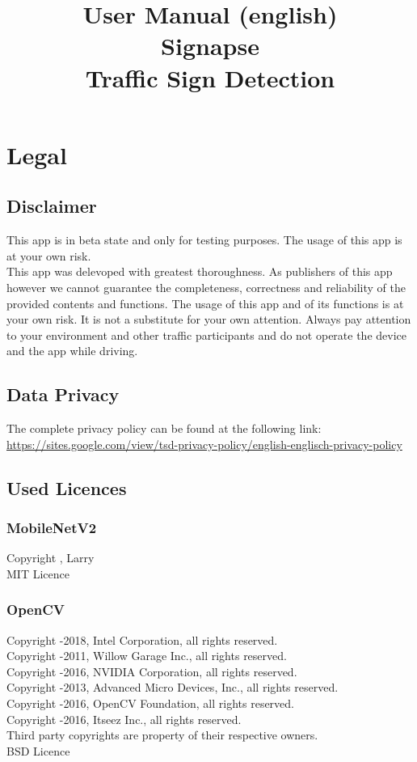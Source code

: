 \documentclass[12pt,a4paper,english,enabledeprecatedfontcommands]{article}
\title{User Manual (english)\\Signapse\\Traffic Sign Detection}
\begin{document}
\maketitle

\section{Legal}

\subsection{Disclaimer}

This app is in beta state and only for testing purposes. The usage of this app is at your own risk.\\
This app was delevoped with greatest thoroughness. As publishers of this app however we cannot guarantee the completeness, correctness and reliability of the provided contents and functions. The usage of this app and of its functions is at your own risk. It is not a substitute for your own attention. Always pay attention to your environment and other traffic participants and do not operate the device and the app while driving.

\subsection{Data Privacy}
The complete privacy policy can be found at the following link:\\
\url{https://sites.google.com/view/tsd-privacy-policy/english-englisch-privacy-policy}

\subsection{Used Licences}

\subsubsection{MobileNetV2}
Copyright , Larry\\
MIT Licence

\subsubsection{OpenCV}
Copyright -2018, Intel Corporation, all rights reserved.\\
Copyright -2011, Willow Garage Inc., all rights reserved.\\
Copyright -2016, NVIDIA Corporation, all rights reserved.\\
Copyright -2013, Advanced Micro Devices, Inc., all rights reserved.\\
Copyright -2016, OpenCV Foundation, all rights reserved.\\
Copyright -2016, Itseez Inc., all rights reserved.\\
Third party copyrights are property of their respective owners.\\
BSD Licence
\end{document}
